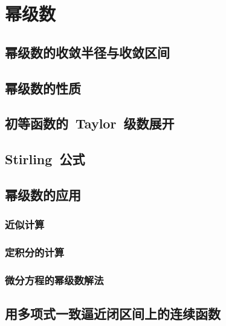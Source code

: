 

\chapter{幂级数}\label{ch:13}
\section{幂级数的收敛半径与收敛区间}
\begin{exercise}
\item
\end{exercise}
\section{幂级数的性质}
\begin{exercise}
\item
\end{exercise}
\section{初等函数的~Taylor~级数展开}
\begin{exercise}
\item
\end{exercise}

\pushstar
\section{Stirling~公式}
\popstar

\begin{exercise}
\item
\end{exercise}
\section{幂级数的应用}
\subsection{近似计算}
\subsection{定积分的计算}
\subsection{微分方程的幂级数解法}
\section{用多项式一致逼近闭区间上的连续函数}
\begin{exercise*}
\item
\end{exercise*}




\endinput
